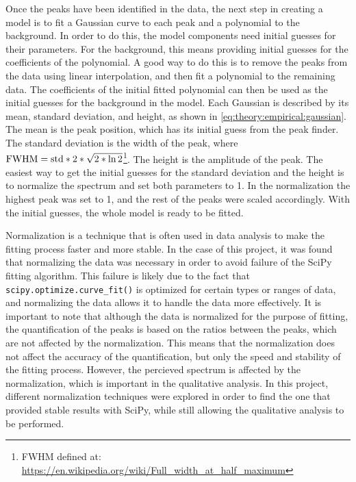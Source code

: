 Once the peaks have been identified in the data, the next step in creating a model is to fit a Gaussian curve to each peak and a polynomial to the background.
In order to do this, the model components need initial guesses for their parameters.
For the background, this means providing initial guesses for the coefficients of the polynomial.
A good way to do this is to remove the peaks from the data using linear interpolation, and then fit a polynomial to the remaining data.
The coefficients of the initial fitted polynomial can then be used as the initial guesses for the background in the model.
Each Gaussian is described by its mean, standard deviation, and height, as shown in \cref{eq:theory:empirical:gaussian}.
The mean is the peak position, which has its initial guess from the peak finder.
The standard deviation is the width of the peak, where $\textnormal{FWHM} = \textnormal{std}*2*\sqrt{2*\ln{2}}$\footnote{FWHM defined at: \url{https://en.wikipedia.org/wiki/Full_width_at_half_maximum}}.
The height is the amplitude of the peak.
The easiest way to get the initial guesses for the standard deviation and the height is to normalize the spectrum and set both parameters to 1.
In the normalization the highest peak was set to 1, and the rest of the peaks were scaled accordingly.
With the initial guesses, the whole model is ready to be fitted.

Normalization is a technique that is often used in data analysis to make the fitting process faster and more stable.
In the case of this project, it was found that normalizing the data was necessary in order to avoid failure of the SciPy fitting algorithm.
This failure is likely due to the fact that \verb|scipy.optimize.curve_fit()| is optimized for certain types or ranges of data, and normalizing the data allows it to handle the data more effectively.
It is important to note that although the data is normalized for the purpose of fitting, the quantification of the peaks is based on the ratios between the peaks, which are not affected by the normalization.
This means that the normalization does not affect the accuracy of the quantification, but only the speed and stability of the fitting process.
However, the percieved spectrum is affected by the normalization, which is important in the qualitative analysis.
In this project, different normalization techniques were explored in order to find the one that provided stable results with SciPy, while still allowing the qualitative analysis to be performed.

